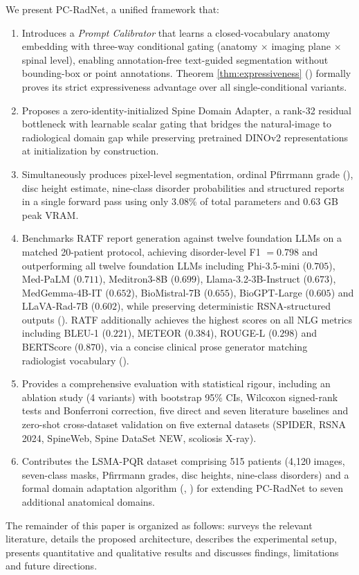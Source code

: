\documentclass[journal]{IEEEtran}
\newcommand{\modelname}{PC-RadNet}
\begin{document}
We present \modelname{}, a unified framework that:
\begin{enumerate}
    \item Introduces a \emph{Prompt Calibrator} that learns a closed-vocabulary anatomy embedding with three-way conditional gating (anatomy $\times$ imaging plane $\times$ spinal level), enabling annotation-free text-guided segmentation without bounding-box or point annotations. Theorem \ref{thm:expressiveness} () formally proves its strict expressiveness advantage over all single-conditional variants.
    \item Proposes a zero-identity-initialized Spine Domain Adapter, a rank-32 residual bottleneck with learnable scalar gating that bridges the natural-image to radiological domain gap while preserving pretrained DINOv2 representations at initialization by construction.
    \item Simultaneously produces pixel-level segmentation, ordinal Pfirrmann grade (), disc height estimate, nine-class disorder probabilities and structured reports in a single forward pass using only 3.08\% of total parameters and 0.63 GB peak VRAM.
    \item Benchmarks RATF report generation against twelve foundation LLMs on a matched 20-patient protocol, achieving disorder-level F1 $=0.798$ and outperforming all twelve foundation LLMs including Phi-3.5-mini ($0.705$), Med-PaLM ($0.711$), Meditron3-8B ($0.699$), Llama-3.2-3B-Instruct ($0.673$), MedGemma-4B-IT ($0.652$), BioMistral-7B ($0.655$), BioGPT-Large ($0.605$) and LLaVA-Rad-7B ($0.602$), while preserving deterministic RSNA-structured outputs (). RATF additionally achieves the highest scores on all NLG metrics including BLEU-1 ($0.221$), METEOR ($0.384$), ROUGE-L ($0.298$) and BERTScore ($0.870$), via a concise clinical prose generator matching radiologist vocabulary ().
    \item Provides a comprehensive evaluation with statistical rigour, including an ablation study (4 variants) with bootstrap 95\% CIs, Wilcoxon signed-rank tests and Bonferroni correction, five direct and seven literature baselines and zero-shot cross-dataset validation on five external datasets (SPIDER, RSNA 2024, SpineWeb, Spine DataSet NEW, scoliosis X-ray).
    \item Contributes the LSMA-PQR dataset comprising 515 patients (4,120 images, seven-class masks, Pfirrmann grades, disc heights, nine-class disorders) and a formal domain adaptation algorithm (, ) for extending \modelname{} to seven additional anatomical domains.
\end{enumerate}
The remainder of this paper is organized as follows:  surveys the relevant literature,  details the proposed architecture,  describes the experimental setup,  presents quantitative and qualitative results and  discusses findings, limitations and future directions.
\end{document}
